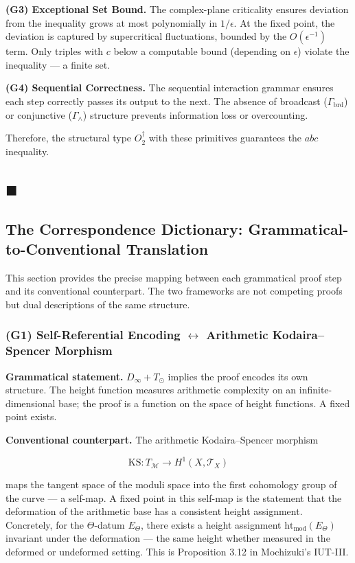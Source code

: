 \documentclass[12pt,a4paper]{article}
\begin{document}
\textbf{(G3) Exceptional Set Bound.} The complex-plane criticality ensures deviation from the inequality grows at most polynomially in $1/\epsilon$. At the fixed point, the deviation is captured by supercritical fluctuations, bounded by the $O(\epsilon^{-1})$ term. Only triples with $c$ below a computable bound (depending on $\epsilon$) violate the inequality --- a finite set.

\textbf{(G4) Sequential Correctness.} The sequential interaction grammar ensures each step correctly passes its output to the next. The absence of broadcast ($\Gamma_\text{brd}$) or conjunctive ($\Gamma_{\wedge}$) structure prevents information loss or overcounting.

Therefore, the structural type $O_2^\dagger$ with these primitives guarantees the $abc$ inequality.

\subsection{$\blacksquare$}

\subsection{The Correspondence Dictionary: Grammatical-to-Conventional Translation}

This section provides the precise mapping between each grammatical proof step and its conventional counterpart. The two frameworks are not competing proofs but dual descriptions of the same structure.

\subsubsection{(G1) Self-Referential Encoding $\leftrightarrow$ Arithmetic Kodaira--Spencer Morphism}

\textbf{Grammatical statement.} $D_{\infty} + T_{\odot}$ implies the proof encodes its own structure. The height function measures arithmetic complexity on an infinite-dimensional base; the proof is a function on the space of height functions. A fixed point exists.

\textbf{Conventional counterpart.} The arithmetic Kodaira--Spencer morphism

\[\text{KS}: T_{\mathcal{M}} \to H^1(X, \mathcal{T}_X)\]

maps the tangent space of the moduli space into the first cohomology group of the curve --- a self-map. A fixed point in this self-map is the statement that the deformation of the arithmetic base has a consistent height assignment. Concretely, for the $\Theta$-datum $E_{\Theta}$, there exists a height assignment $\text{ht}_{\text{mod}}(E_{\Theta})$ invariant under the deformation --- the same height whether measured in the deformed or undeformed setting. This is Proposition 3.12 in Mochizuki's IUT-III.
\end{document}
